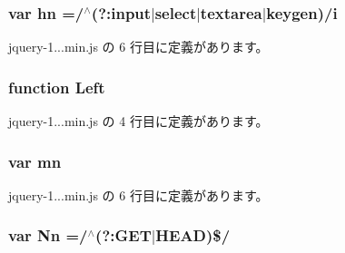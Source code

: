 \hypertarget{jquery-1_810_82_8min_8js_a703d7f6a2aadb540eb051a5f62674194}{}
\subsubsection[{hn}]{\setlength{\rightskip}{0pt plus 5cm}var hn =/$^\wedge$(?\+:input$\vert$select$\vert$textarea$\vert$keygen)/i}\label{jquery-1_810_82_8min_8js_a703d7f6a2aadb540eb051a5f62674194}


 jquery-\/1...\+min.\+js の 6 行目に定義があります。

\hypertarget{jquery-1_810_82_8min_8js_abef68bf244a1159a49fe3a2c153a65d2}{}
\subsubsection[{Left}]{\setlength{\rightskip}{0pt plus 5cm}function Left}\label{jquery-1_810_82_8min_8js_abef68bf244a1159a49fe3a2c153a65d2}


 jquery-\/1...\+min.\+js の 4 行目に定義があります。

\hypertarget{jquery-1_810_82_8min_8js_a227fb8e4dbaed5a772526c7e9bb0795f}{}
\subsubsection[{mn}]{\setlength{\rightskip}{0pt plus 5cm}var mn}\label{jquery-1_810_82_8min_8js_a227fb8e4dbaed5a772526c7e9bb0795f}


 jquery-\/1...\+min.\+js の 6 行目に定義があります。

\hypertarget{jquery-1_810_82_8min_8js_a03586bb881647685652f72d98d189ed0}{}
\subsubsection[{Nn}]{\setlength{\rightskip}{0pt plus 5cm}var Nn =/$^\wedge$(?\+:G\+E\+T$\vert$H\+E\+A\+D)\$/}\label{jquery-1_810_82_8min_8js_a03586bb881647685652f72d98d189ed0}


